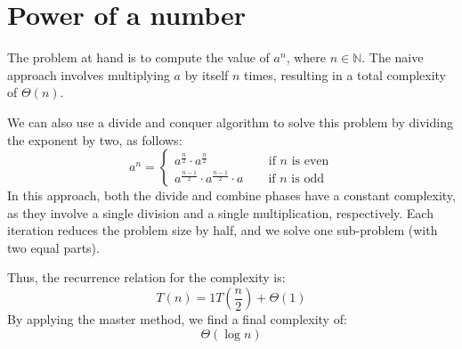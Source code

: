 \section{Power of a number}

The problem at hand is to compute the value of $a^n$, where $n\in\mathbb{N}$. 
The naive approach involves multiplying $a$ by itself $n$ times, resulting in a total complexity of $\Theta(n)$. 

We can also use a divide and conquer algorithm to solve this problem by dividing the exponent by two, as follows:
\[a^n=\begin{cases} a^\frac{n}{2}\cdot a^\frac{n}{2}  \:\:\:\:\qquad\qquad \text{if }n\text{ is even} \\ a^\frac{n-1}{2}\cdot a^\frac{n-1}{2} \cdot a \qquad \text{if }n\text{ is odd} \end{cases}\]
In this approach, both the divide and combine phases have a constant complexity, as they involve a single division and a single multiplication, respectively. 
Each iteration reduces the problem size by half, and we solve one sub-problem (with two equal parts).

Thus, the recurrence relation for the complexity is:
\[T(n)=1T\left(\dfrac{n}{2}\right)+\Theta(1)\]
By applying the master method, we find a final complexity of:
\[\Theta(\log n)\]